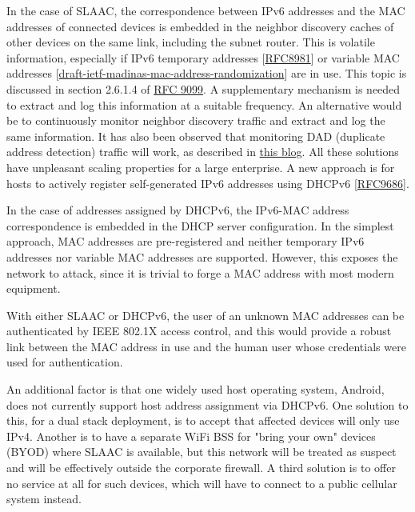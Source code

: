 \documentclass[
]{article}
\begin{document}
In the case of SLAAC, the correspondence between IPv6 addresses and the
MAC addresses of connected devices is embedded in the neighbor discovery
caches of other devices on the same link, including the subnet router.
This is volatile information, especially if IPv6 temporary addresses
{[}\href{https://www.rfc-editor.org/info/rfc8981}{RFC8981}{]} or
variable MAC addresses
{[}\href{https://datatracker.ietf.org/doc/draft-ietf-madinas-mac-address-randomization/}{draft-ietf-madinas-mac-address-randomization}{]}
are in use. This topic is discussed in section 2.6.1.4 of
\href{https://www.rfc-editor.org/info/rfc9099}{RFC 9099}. A
supplementary mechanism is needed to extract and log this information at
a suitable frequency. An alternative would be to continuously monitor
neighbor discovery traffic and extract and log the same information. It
has also been observed that monitoring DAD (duplicate address detection)
traffic will work, as described in
\href{https://weberblog.net/monitoring-mac-ipv6-address-bindings/}{this
blog}. All these solutions have unpleasant scaling properties for a
large enterprise. A new approach is for hosts to actively register
self-generated IPv6 addresses using DHCPv6
{[}\href{https://www.rfc-editor.org/info/rfc9686}{RFC9686}{]}.

In the case of addresses assigned by DHCPv6, the IPv6-MAC address
correspondence is embedded in the DHCP server configuration. In the
simplest approach, MAC addresses are pre-registered and neither
temporary IPv6 addresses nor variable MAC addresses are supported.
However, this exposes the network to attack, since it is trivial to
forge a MAC address with most modern equipment.

With either SLAAC or DHCPv6, the user of an unknown MAC addresses can be
authenticated by IEEE 802.1X access control, and this would provide a
robust link between the MAC address in use and the human user whose
credentials were used for authentication.

An additional factor is that one widely used host operating system,
Android, does not currently support host address assignment via DHCPv6.
One solution to this, for a dual stack deployment, is to accept that
affected devices will only use IPv4. Another is to have a separate WiFi
BSS for "bring your own" devices (BYOD) where SLAAC is available, but
this network will be treated as suspect and will be effectively outside
the corporate firewall. A third solution is to offer no service at all
for such devices, which will have to connect to a public cellular system
instead.
\end{document}
